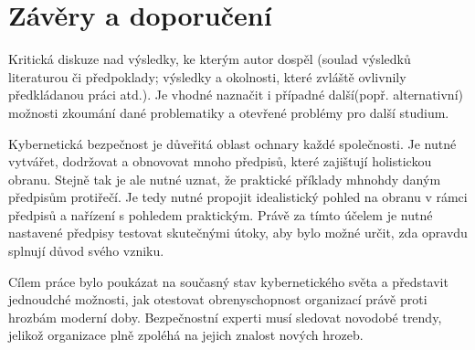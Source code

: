 
\section{Závěry a doporučení}\label{sec:zavery-a-doporuceni}


Kritická diskuze nad výsledky, ke kterým autor dospěl (soulad výsledků  literaturou či předpoklady;
výsledky a okolnosti, které zvláště ovlivnily předkládanou práci atd.).
Je vhodné naznačit i případné další(popř. alternativní) možnosti zkoumání dané problematiky a otevřené problémy pro další studium.


Kybernetická bezpečnost je důveřitá oblast ochnary každé společnosti.
Je nutné vytvářet, dodržovat a obnovovat mnoho předpisů, které zajištují holistickou obranu.
Stejně tak je ale nutné uznat, že praktické příklady mhnohdy daným předpisům protiřečí.
Je tedy nutné propojit idealistický pohled na obranu v rámci předpisů a nařízení s pohledem praktickým.
Právě za tímto účelem je nutné nastavené předpisy testovat skutečnými útoky, aby bylo možné určit, zda opravdu splnují důvod svého vzniku.

Cílem práce bylo poukázat na současný stav kybernetického světa a představit jednoudché možnosti, jak otestovat obrenyschopnost organizací právě proti hrozbám moderní doby.%
Bezpečnostní experti musí sledovat novodobé trendy, jelikož organizace plně zpoléhá na jejich znalost nových hrozeb.

